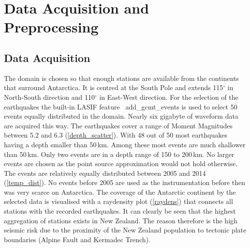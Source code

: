 
\chapter{Data Acquisition and Preprocessing}

\section{Data Acquisition}

The domain is chosen so that enough stations are available from the continents that surround Antarctica.
It is centred at the South Pole and extends 115$^\circ$ in North-South direction and 110$^\circ$ in
East-West direction. 
For the selection of the earthquakes the built-in LASIF feature \
add\_gcmt\_events is used to select 50 events equally distributed in the
domain. %
Nearly six gigabyte of waveform data are acquired this way.
The earthquakes cover a range of Moment Magnitudes between 5.2 and 6.3 (\autoref{depth_scatter}). 
With 48 out of 50 most earthquakes having a depth smaller than 50\,km. Among these most 
events are much shallower than 50\,km. Only two events are in a depth range of 150 to 200\,km. 
No larger events are chosen as the point source approximation would not hold otherwise. 
The events are relatively equally distributed between 2005 and 2014 (\autoref{temp_dist}). No events before 2005 are used as the instrumentation before then was very scarce on Antarctica. 
The coverage of the Antarctic continent by the selected data is visualised with a raydensity plot (\autoref{raydens}) 
that connects all stations with the recorded earthquakes. It can clearly be seen that the highest aggregation of stations 
exists in New Zealand. The reason therefore is the high seismic risk due to the proximity of the New Zealand population to tectonic plate boundaries (Alpine Fault and Kermadec Trench). \\



